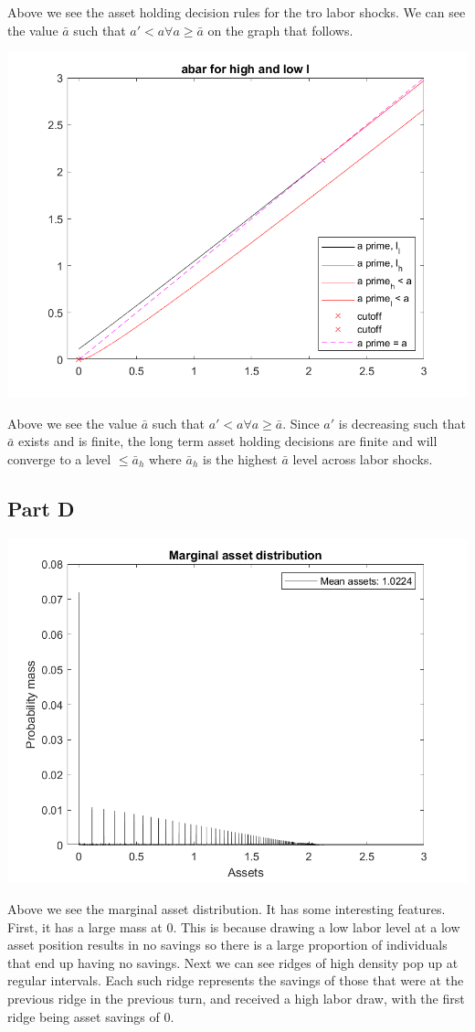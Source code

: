 \documentclass[11pt]{article} %
\begin{document}
Above we see the asset holding decision rules for the tro labor shocks. We can see the value $\bar{a}$ such that $a'<a \forall a\geq \bar{a}$ on the graph that follows.

\includegraphics{abar}

Above we see the value $\bar{a}$ such that $a'<a \forall a\geq \bar{a}$. Since $a'$ is decreasing such that $\bar{a}$ exists and is finite, the long term asset holding decisions are finite and will converge to a level $\leq\bar{a}_h$ where $\bar{a}_h$ is the highest $\bar{a}$ level across labor shocks. 

\subsection{Part D}

\includegraphics{marginal}

Above we see the marginal asset distribution. It has some interesting features. First, it has a large mass at $0$. This is because drawing a low labor level at a low asset position results in no savings so there is a large proportion of individuals that end up having no savings. Next we can see ridges of high density pop up at regular intervals. Each such ridge represents the savings of those that were at the previous ridge in the previous turn, and received a high labor draw, with the first ridge being asset savings of 0.
\end{document}
